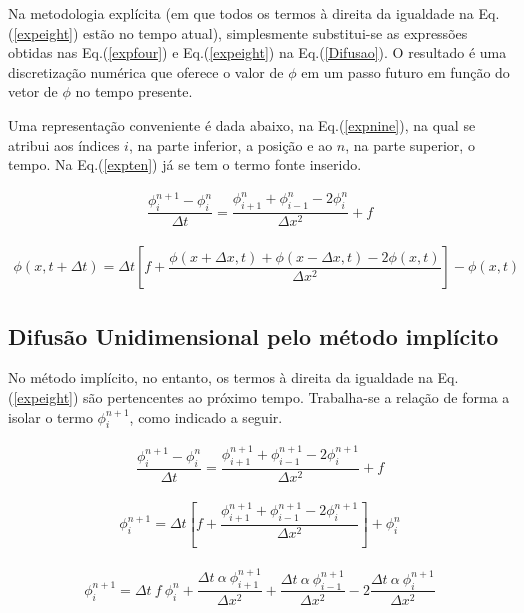 	Na metodologia explícita (em que todos os termos à direita da igualdade na Eq.(\ref{expeight}) estão no tempo atual), simplesmente substitui-se as expressões obtidas nas Eq.(\ref{expfour}) e Eq.(\ref{expeight}) na Eq.(\ref{Difusao}). O resultado é uma discretização numérica que oferece o valor de $\phi$ em um passo futuro em função do vetor de $\phi$ no tempo presente.
	
	Uma representação conveniente é dada abaixo, na Eq.(\ref{expnine}), na qual se atribui aos índices $i$, na parte inferior, a posição e ao $n$, na parte superior, o tempo. Na Eq.(\ref{expten}) já se tem o termo fonte inserido.
	
\begin{align}
\label{expnine}
\dfrac{\phi_{i}^{n+1} - \phi_{i}^{n}}{\Delta t} = \dfrac{\phi_{i+1}^{n} + \phi_{i-1}^{n} - 2 \phi_{i}^{n}}{\Delta x^2} + f
\end{align}
	
\begin{align}
\label{expten}
\phi(x,t+\Delta t) = \Delta t \left[f+ \dfrac{\phi(x + \Delta x,t) + \phi(x - \Delta x,t) - 2 \phi(x,t)}{\Delta x^2} \right] - \phi(x,t)
\end{align}

\subsection{Difusão Unidimensional pelo método implícito}
\noindent

	No método implícito, no entanto, os termos à direita da igualdade na Eq.(\ref{expeight}) são pertencentes ao próximo tempo. Trabalha-se a relação de forma a isolar o termo $\phi_{i}^{n+1}$, como indicado a seguir.
	
\begin{align}
\label{expeleven}
\dfrac{\phi_{i}^{n+1} - \phi_{i}^{n}}{\Delta t} = \dfrac{\phi_{i+1}^{n+1} + \phi_{i-1}^{n+1} - 2 \phi_{i}^{n+1}}{\Delta x^2} + f
\end{align}

\begin{align}
\label{exptwelve}
\phi_{i}^{n+1} = \Delta t \left[f+ \dfrac{\phi_{i+1}^{n+1} + \phi_{i-1}^{n+1} - 2 \phi_{i}^{n+1} }{\Delta x^2} \right] + \phi_{i}^{n}
\end{align}

\begin{align}
\label{expthirteen}
\phi_{i}^{n+1} = \Delta t \ f \ \phi_{i}^{n} + \dfrac{\Delta t \  \alpha \ \phi_{i+1}^{n+1}}{\Delta x^2} + \dfrac{\Delta t \ \alpha \ \phi_{i-1}^{n+1}}{\Delta x^2} - 2 \dfrac{\Delta t \ \alpha \ \phi_{i}^{n+1}}{\Delta x^2}
\end{align}

